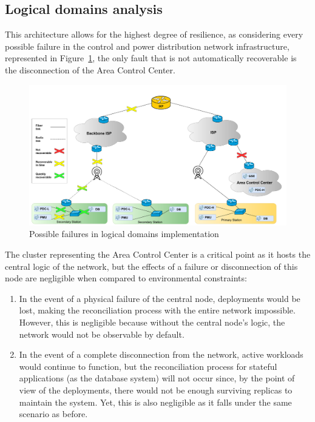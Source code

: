 \subsection{Logical domains analysis}

This architecture allows for the highest degree of resilience, as considering every possible failure in the control and power distribution network infrastructure, represented in Figure~\ref{fig:failures}, the only fault that is not automatically recoverable is the disconnection of the Area Control Center.

\begin{figure}[ht]\centering
\includegraphics[scale=0.20]{Pictures/failures}
\caption{Possible failures in logical domains implementation}\label{fig:failures}
\end{figure}

The cluster representing the Area Control Center is a critical point as it hosts the central logic of the network, but the effects of a failure or disconnection of this node are negligible when compared to environmental constraints:

\begin{enumerate}
\item In the event of a physical failure of the central node, deployments would be lost, making the reconciliation process with the entire network impossible. However, this is negligible because without the central node's logic, the network would not be observable by default.
\item In the event of a complete disconnection from the network, active workloads would continue to function, but the reconciliation process for stateful applications (as the database system) will not occur since, by the point of view of the deployments, there would not be enough surviving replicas to maintain the system. Yet, this is also negligible as it falls under the same scenario as before.
\end{enumerate}

